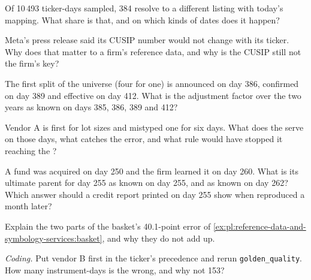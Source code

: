 \begin{exercise}[$\star$]\label{exo:pl:reference-data-and-symbology-services:1}
Of 10\,493 ticker-days sampled, 384 resolve to a different listing with today's mapping. What share is that, and on which kinds of
dates does it happen?
\end{exercise}

\begin{exercise}[$\star$]\label{exo:pl:reference-data-and-symbology-services:2}
Meta's press release said its CUSIP number would not change with its ticker. Why does that matter to a firm's reference data, and
why is the CUSIP still not the firm's key?
\end{exercise}

\begin{exercise}[$\star$]\label{exo:pl:reference-data-and-symbology-services:3}
The first split of the universe (four for one) is announced on day 386, confirmed on day 389 and effective on day 412. What is the
adjustment factor over the two years as known on days 385, 386, 389 and 412?
\end{exercise}

\begin{exercise}[$\star\star$]\label{exo:pl:reference-data-and-symbology-services:4}
Vendor A is first for lot sizes and mistyped one for six days. What does the  serve on those days, what catches the
error, and what rule would have stopped it reaching the ?
\end{exercise}

\begin{exercise}[$\star\star$]\label{exo:pl:reference-data-and-symbology-services:5}
A fund was acquired on day 250 and the firm learned it on day 260. What is its ultimate parent for day 255 as known on day 255, and
as known on day 262? Which answer should a credit report printed on day 255 show when reproduced a month later?
\end{exercise}

\begin{exercise}[$\star\star$]\label{exo:pl:reference-data-and-symbology-services:6}
Explain the two parts of the basket's 40.1-point error of \cref{ex:pl:reference-data-and-symbology-services:basket}, and why they do
not add up.
\end{exercise}

\begin{exercise}[$\star\star\star$]\label{exo:pl:reference-data-and-symbology-services:7}
\emph{Coding.} Put vendor B first in the ticker's precedence and rerun \texttt{golden\_quality}. How many instrument-days is the
 wrong, and why not 153?
\end{exercise}

